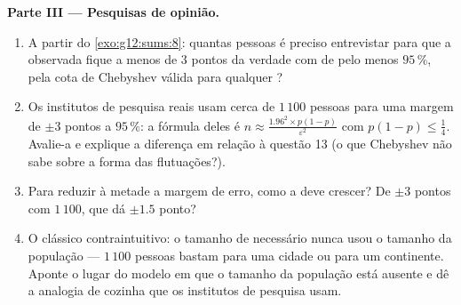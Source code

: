 \begin{problem}
\medskip
\noindent\textbf{Parte III --- Pesquisas de opinião.}
\begin{enumerate}[resume]
  \item A partir do \cref{exo:g12:sums:8}: quantas pessoas é
        preciso entrevistar para que a  observada
        fique a menos de $3$ pontos da verdade com 
        de pelo menos $95\,\%$, pela cota de Chebyshev válida
        para qualquer ?
  \item Os institutos de pesquisa reais usam cerca de
        $1\,100$ pessoas para uma margem de $\pm 3$ pontos a
        $95\,\%$: a fórmula deles é
        $n \approx \frac{1.96^2 \times p(1-p)}
        {\varepsilon^2}$ com $p(1-p) \leq \frac14$. Avalie-a e
        explique a diferença em relação à questão 13 (o que
        Chebyshev não sabe sobre a forma das flutuações?).
  \item Para reduzir à metade a margem de erro, como a 
        deve crescer? De $\pm 3$ pontos com $1\,100$, que
         dá $\pm 1.5$ ponto?
  \item O clássico contraintuitivo: o tamanho de 
        necessário nunca usou o tamanho da população ---
        $1\,100$ pessoas bastam para uma cidade ou para um
        continente. Aponte o lugar do modelo em que o tamanho
        da população está ausente e dê a analogia de cozinha
        que os institutos de pesquisa usam.
\end{enumerate}


\end{problem}
